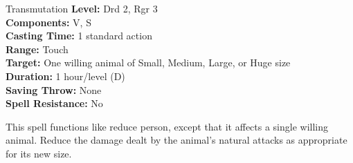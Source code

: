 {Transmutation}
{
	\textbf{Level:}
	Drd 2, Rgr 3\\
	\textbf{Components:}
	V, S\\
	\textbf{Casting Time:}
	1 standard action\\
	\textbf{Range:}
	Touch\\
	\textbf{Target:}
	One willing animal of Small, Medium, Large, or Huge size\\
	\textbf{Duration:}
	1 hour/level (D)\\
	\textbf{Saving Throw:}
	None\\
	\textbf{Spell Resistance:}
	No\\
}
{
	This spell functions like reduce person, except that it affects a single willing animal. Reduce the damage dealt by the animal's natural attacks as appropriate for its new size.

}

